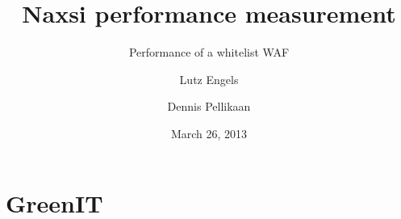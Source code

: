 \documentclass[11pt]{beamer}
\title{Naxsi performance measurement}
\subtitle{Performance of a whitelist WAF}
\author{Lutz Engels \and Dennis Pellikaan}
\institute[University of Amsterdam] %
{
{\large University of Amsterdam} \\
System and Network Engineering
}
\date{March 26, 2013}
\begin{document}
\begin{frame}
  \titlepage
\end{frame}
\section{GreenIT}




\end{document}

